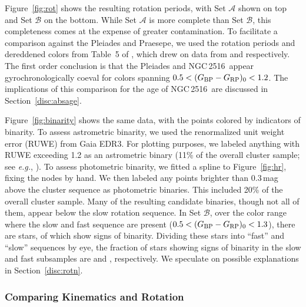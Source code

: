\documentclass[12pt,twocolumn,tighten]{aastex63}
\newcommand{\cn}{NGC\,2516} %
\newcommand{\bpmrpo}{(G_{\rm BP}-G_{\rm RP})_0}
\begin{document}
Figure~\ref{fig:rot} shows the resulting rotation periods, with Set
$\mathcal{A}$ shown on top and Set $\mathcal{B}$ on the bottom.  While
Set $\mathcal{A}$ is more complete than Set $\mathcal{B}$, this
completeness comes at the expense of greater contamination.    To facilitate a comparison against the Pleiades and
Praesepe, we used the rotation periods and dereddened colors from Table~5
of \citet{curtis_rup147_2020}, which drew on data from
\citet{rebull_rotation_2016a} and \citet{douglas_k2_2019} respectively.
The first order conclusion is that the Pleiades and \cn\ appear
gyrochronologically coeval for colors spanning $0.5<\bpmrpo<1.2$.  The
implications of this comparison for the age of \cn\ are discussed in
Section~\ref{disc:absage}.


Figure~\ref{fig:binarity} shows the same data, with the points colored by
indicators of binarity.  To assess astrometric binarity, we used the
renormalized unit weight error (RUWE) from Gaia EDR3.  For plotting
purposes, we labeled anything with RUWE exceeding 1.2 as an astrometric
binary (11\% of the overall cluster sample; see {\it e.g.},
\citealt{belokurov_unresolved_2020}).  To assess photometric binarity, we
fitted a spline to Figure~\ref{fig:hr}, fixing the nodes by hand.  We
then labeled any points brighter than 0.3\,mag above the cluster sequence
as photometric binaries.  This included 20\% of the overall cluster
sample.  Many of the resulting candidate binaries, though not all of
them, appear below the slow rotation sequence.  In Set $\mathcal{B}$,
over the color range where the slow and fast sequence are present
($0.5<\bpmrpo<1.3$), there are  stars, of which
 show signs of binarity.  Dividing these
 stars into ``fast'' and ``slow'' sequences by eye,
the fraction of stars showing signs of binarity in the slow and fast
subsamples are  and , respectively.  We speculate on possible
explanations in Section~\ref{disc:rotn}.


\subsubsection{Comparing Kinematics and Rotation}
\end{document}
